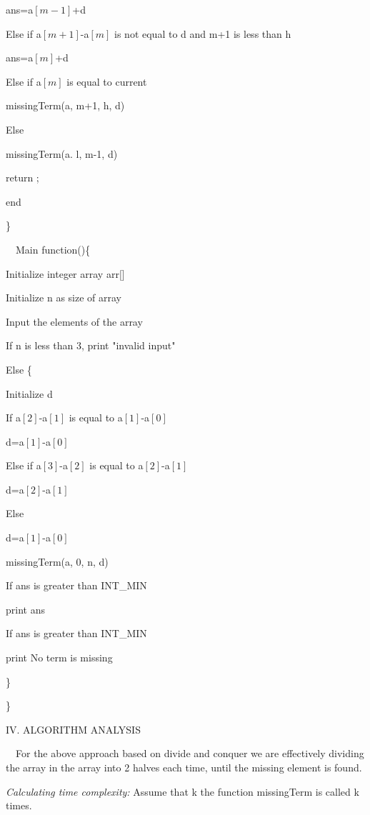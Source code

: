 \documentclass[12pt,a4paper]{article}
\begin{document}
\begin{multicols}{2}
\quad\quad ans=a$[m-1]$+d 


\quad Else if a$[m+1]$-a$[m]$ is not equal to d and m+1 is less than h 

 \quad\quad ans=a$[m]$+d 
 
 \quad Else if a$[m]$ is equal to current
 
 \quad\quad missingTerm(a, m+1, h, d)
 
 \quad Else 
 
 \quad\quad missingTerm(a. l, m-1, d)

 

\quad return ; 

end

\} 

\ \ Main function()\{ 

\quad Initialize integer array arr$[$$]$

\quad  Initialize n as size of array

\quad Input the elements of the array 

\quad If n is less than 3, print "invalid input"

\quad Else \{

\quad Initialize d

\quad If a$[2]$-a$[1]$ is equal to a$[1]$-a$[0]$

\quad \quad d=a$[1]$-a$[0]$

\quad Else if a$[3]$-a$[2]$ is equal to a$[2]$-a$[1]$

\quad \quad d=a$[2]$-a$[1]$

\quad Else 

\quad \quad d=a$[1]$-a$[0]$

\quad missingTerm(a, 0, n, d)

\quad If ans is greater than INT\_MIN

\quad \quad print ans

\quad If ans is greater than INT\_MIN

\quad \quad print No term is missing

\}



\} 


\begin{center}IV. ALGORITHM ANALYSIS\end{center}


\ \ For the above approach based on divide and conquer we are effectively dividing the array in the array into 2 halves each time, until the missing element is found.
 

\textit{ Calculating time complexity: }Assume that k the function missingTerm is called k times. 


\end{multicols}
\end{document}
